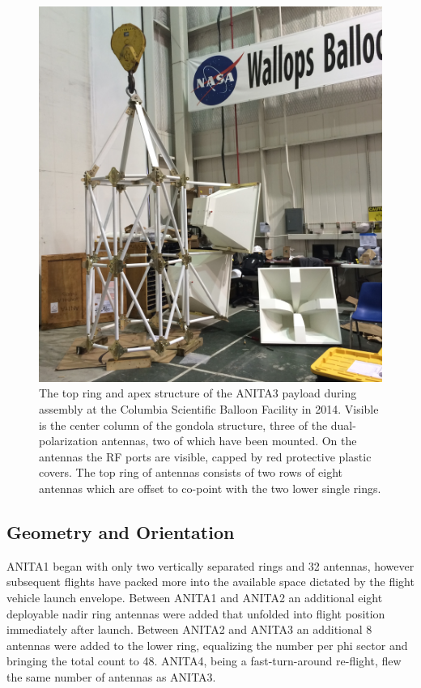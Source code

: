 \begin{figure}
\centering
	\includegraphics[width=\textwidth]{figures/AntennaAssembly}
	\caption{The top ring and apex structure of the ANITA3 payload during assembly at the Columbia Scientific Balloon Facility in 2014.  Visible is the center column of the gondola structure, three of the dual-polarization antennas, two of which have been mounted.  On the antennas the RF ports are visible, capped by red protective plastic covers.  The top ring of antennas consists of two rows of eight antennas which are offset to co-point with the two lower single rings.}
	\label{fig:antennaAssembly}
\end{figure}	
	
\subsection{Geometry and Orientation}
	ANITA1 began with only two vertically separated rings and 32 antennas, however subsequent flights have packed more into the available space dictated by the flight vehicle launch envelope.  Between ANITA1 and ANITA2 an additional eight deployable nadir ring antennas were added that unfolded into flight position immediately after launch.  Between ANITA2 and ANITA3 an additional 8 antennas were added to the lower ring, equalizing the number per phi sector and bringing the total count to 48.  ANITA4, being a fast-turn-around re-flight, flew the same number of antennas as ANITA3.  
	
